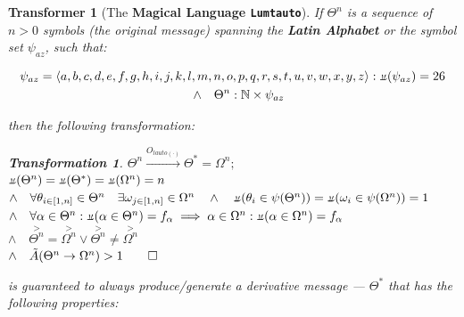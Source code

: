 \documentclass[a4paper, 18pt]{book} %
\newtheorem{trans}{Transformation}
\newtheorem{transf}{Transformer}
\newcommand{\invpi}{\rotatebox[origin=c]{180}{$\pi$}}
\begin{document}
\begin{transf}[The \textbf{Magical Language \texttt{Lumtauto}}]
\label{TRANSFLUMTAUTO}
If $\Theta^n$ is a sequence of $n > 0$ symbols (the original message) spanning the \textbf{Latin Alphabet} or the symbol set $\psi_{az}$, such that:

\begin{multline}
\label{EQLATINALPHABET}
\psi_{az} = \langle a, b, c, d, e, f, g, h, i, j, k, l, m, n, o, p, q, r, s, t, u, v, w, x, y, z \rangle: \invpi(\psi_{az}) = 26 \\ \quad \land \quad \Theta^n:\mathbb{N} \times \psi_{az}
\end{multline}

then the following transformation:

\begin{trans}
\label{TRANSLUMTAUTO}
$\Theta^n \xrightarrow{O_{lauto(\cdot)}} \Theta^* = \Omega^n;$\\
$\invpi(\Theta^n) = \invpi(\Theta^*) = \invpi(\Omega^n) = n$\\
$\land \quad \forall \theta_{i \in [1,n]} \in \Theta^n \quad \exists \omega_{j \in [1,n]} \in \Omega^n \quad \land \quad \invpi(\theta_i \in \psi(\Theta^n)) = \invpi(\omega_i \in \psi(\Omega^n)) = 1$\\
$\land \quad \forall \alpha \in \Theta^n: \invpi(\alpha \in \Theta^n) = f_\alpha \implies \alpha \in \Omega^n: \invpi(\alpha \in \Omega^n) = f_\alpha$\\
$\land \quad \overset{>}{\Theta^n} = \overset{>}{\Omega^n} \lor \overset{>}{\Theta^n} \neq \overset{>}{\Omega^n}$\\
$\land \quad \tilde{A}(\Theta^n \rightarrow \Omega^n) > 1 \qed$
\end{trans}

is guaranteed to always produce/generate a derivative message --- $\Theta^*$ that has the following properties:

{
\normalsize

}
\end{transf}
\end{document}
